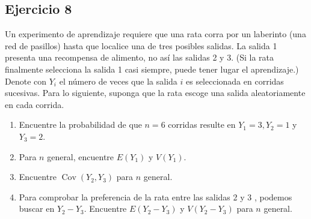 \documentclass[
]{article}
\begin{document}
\subsection{Ejercicio 8}\label{ejercicio-8}

Un experimento de aprendizaje requiere que una rata corra por un laberinto (una red de pasillos) hasta que localice una de tres posibles salidas. La salida 1 presenta una recompensa de alimento, no así las salidas 2 y 3. (Si la rata finalmente selecciona la salida 1 casi siempre, puede tener lugar el aprendizaje.) Denote con \(Y_{i}\) el número de veces que la salida \(i\) es seleccionada en corridas sucesivas. Para lo siguiente, suponga que la rata escoge una salida aleatoriamente en cada corrida.

\begin{enumerate}
\def\labelenumi{\alph{enumi}.}
\item
  Encuentre la probabilidad de que \(n=6\) corridas resulte en \(Y_{1}=3, Y_{2}=1\) y \(Y_{3}=2\).
\item
  Para \(n\) general, encuentre \(E\left(Y_{1}\right)\) y \(V\left(Y_{1}\right)\).
\item
  Encuentre \(\operatorname{Cov}\left(Y_{2}, Y_{3}\right)\) para \(n\) general.
\item
  Para comprobar la preferencia de la rata entre las salidas 2 y 3 , podemos buscar en \(Y_{2}-Y_{3}\). Encuentre \(E\left(Y_{2}-Y_{3}\right)\) y \(V\left(Y_{2}-Y_{3}\right)\) para \(n\) general.
\end{enumerate}
\end{document}
